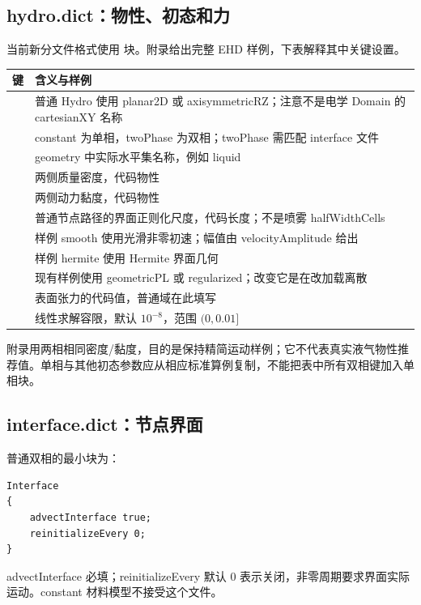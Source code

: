 \documentclass[a4paper,11pt]{article}
\begin{document}
\subsection{hydro.dict：物性、初态和力}
当前新分文件格式使用  块。附录给出完整 EHD 样例，下表解释其中关键设置。
\begin{longtable}{L{.33\linewidth}L{.59\linewidth}}
\toprule 键 & 含义与样例 \\\midrule\endhead
{} & 普通 Hydro 使用 planar2D 或 axisymmetricRZ；注意不是电学 Domain 的 cartesianXY 名称 \\
 & constant 为单相，twoPhase 为双相；twoPhase 需匹配 interface 文件 \\
 & geometry 中实际水平集名称，例如 liquid \\
 & 两侧质量密度，代码物性 \\
 & 两侧动力黏度，代码物性 \\
 & 普通节点路径的界面正则化尺度，代码长度；不是喷雾 halfWidthCells \\
 & 样例 smooth 使用光滑非零初速；幅值由 velocityAmplitude 给出 \\
 & 样例 hermite 使用 Hermite 界面几何 \\
 & 现有样例使用 geometricPL 或 regularized；改变它是在改加载离散 \\
 & 表面张力的代码值，普通域在此填写 \\
 & 线性求解容限，默认 $10^{-8}$，范围 $(0,0.01]$ \\
\bottomrule
\end{longtable}
附录用两相相同密度/黏度，目的是保持精简运动样例；它不代表真实液气物性推荐值。单相与其他初态参数应从相应标准算例复制，不能把表中所有双相键加入单相块。

\subsection{interface.dict：节点界面}
普通双相的最小块为：
\begin{lstlisting}
Interface
{
    advectInterface true;
    reinitializeEvery 0;
}
\end{lstlisting}
advectInterface 必填；reinitializeEvery 默认 0 表示关闭，非零周期要求界面实际运动。constant 材料模型不接受这个文件。
\end{document}
